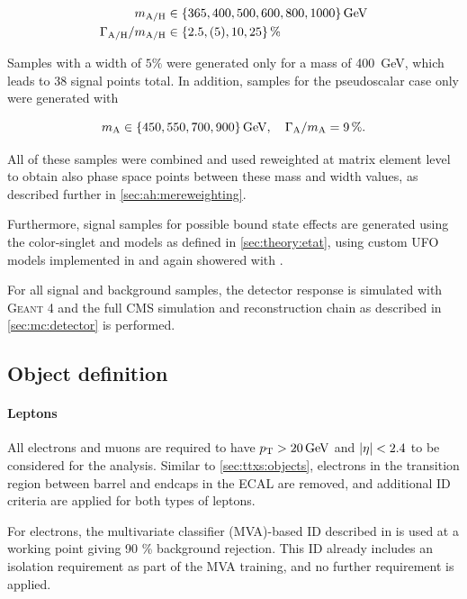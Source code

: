\begin{equation}
\begin{split}
    m_{\AH} &\in \{ 365, 400, 500, 600, 800, 1000 \} \, \si{\GeV} \\
    \Gamma_{\AH} / m_{\AH} &\in \{ 2.5, (5), 10, 25 \} \, \%
\end{split}
\end{equation}

Samples with a width of $5\%$ were generated only for a mass of \SI{400}{\GeV}, which leads to 38 signal points total. In addition, samples for the pseudoscalar case only were generated with

\begin{equation}
    \mA \in \{ 450, 550, 700, 900 \} \, \si{GeV}, \quad \wA / \mA = 9 \, \%.
\end{equation}

All of these samples were combined and used reweighted at matrix element level to obtain also phase space points between these mass and width values, as described further in \cref{sec:ah:mereweighting}.

Furthermore, signal samples for possible \ttbar bound state effects are generated using the color-singlet \etat and \chit models as defined in \cref{sec:theory:etat}, using custom UFO models implemented in \madgraph and again showered with \pythia.

For all signal and background samples, the detector response is simulated with \textsc{Geant 4} and the full CMS simulation and reconstruction chain as described in \cref{sec:mc:detector} is performed.

\subsection{Object definition}
\label{sec:ah:objects}

\paragraph{Leptons} 

All electrons and muons are required to have $\pt > \SI{20}{\GeV}$ and $\abseta < 2.4$ to be considered for the analysis. Similar to \cref{sec:ttxs:objects}, electrons in the transition region between barrel and endcaps in the ECAL are removed, and additional ID criteria are applied for both types of leptons.

For electrons, the multivariate classifier (MVA)-based ID described in  is used at a working point giving 90 \% background rejection. This ID already includes an isolation requirement as part of the MVA training, and no further requirement is applied.

